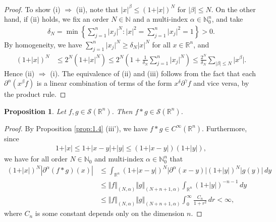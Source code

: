 \documentclass{article}
\numberwithin{equation}{section}
\newcommand{\bbN}{\mathbb{N}}
\newcommand{\bbR}{\mathbb{R}}
\renewcommand{\cal}{\mathcal}
\theoremstyle{plain}
\newtheorem{proposition}[theorem]{Proposition}
\theoremstyle{definition}
\begin{document}
\begin{proof}
To show (i) $\Rightarrow$ (ii), note that $\vert x\vert^\beta\leq(1+\vert x\vert)^N$ for $\vert\beta\vert\leq N$. On the other hand, if (ii) holds, we fix an order $N\in\bbN$ and a multi-index $\alpha\in\bbN_0^n$, and take
\begin{align*}
	\delta_N=\min\left\{\sum_{j=1}^n\vert x_j\vert^N:\vert x\vert^2=\sum_{j=1}^n\vert x_j\vert^2=1\right\}>0.
\end{align*}
By homogeneity, we have $\sum_{j=1}^n\vert x_j\vert^N\geq\delta_N\vert x\vert^N$ for all $x\in\bbR^n$, and
\begin{align*}
	\left(1+\vert x\vert\right)^N&\leq 2^N\left(1+\vert x\vert^N\right)\leq 2^N\left(1+\frac{1}{\delta_N}\sum_{j=1}^n\vert x_j\vert^N\right)\leq \frac{2^N}{\delta_N}\sum_{\vert\beta\vert\leq N}\vert x^\beta\vert.
\end{align*}
Hence (ii) $\Rightarrow$ (i). The equivalence of (ii) and (iii) follows from the fact that each $\partial^\alpha(x^\beta f)$ is a linear combination of terms of the form $x^\delta\partial^\gamma f$ and vice versa, by the product rule.
\end{proof}

\begin{proposition}
Let $f,g\in\cal{S}(\bbR^n)$. Then $f*g\in\cal{S}(\bbR^n)$.
\end{proposition}
\begin{proof}
By Proposition \ref{prop:1.4} (iii'), we have $f*g\in C^\infty(\bbR^n)$. Furthermore, since
\begin{align*}
	1+\vert x\vert\leq 1+\vert x-y\vert+\vert y\vert\leq \left(1+\vert x-y\vert\right)\left(1+\vert y\vert\right),
\end{align*}
we have for all order $N\in\bbN_0$ and multi-index $\alpha\in\bbN_0^n$ that
\begin{align*}
	(1+\vert x\vert)^N\left\vert\partial^\alpha(f*g)(x)\right\vert&\leq\int_{\bbR^n}\left(1+\vert x-y\vert\right)^N\vert\partial^\alpha(x-y)\vert\left(1+\vert y\vert\right)^N\vert g(y)\vert\,dy\\
	&\leq\Vert f\Vert_{(N,\alpha)}\Vert g\Vert_{(N+n+1,\alpha)}\int_{\bbR^n}\left(1+\vert y\vert\right)^{-n-1}\,dy\\
	&\leq\Vert f\Vert_{(N,\alpha)}\Vert g\Vert_{(N+n+1,\alpha)}\int_0^\infty\frac{C_n}{1+r^2}\,dr<\infty,
\end{align*}
where $C_n$ is some constant depends only on the dimension $n$.
\end{proof}
\end{document}
